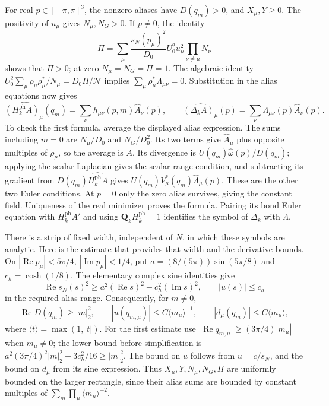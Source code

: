For real $p\in[-\pi,\pi]^3$, the nonzero aliases have $D(q_m)>0$,
and $X_\mu,Y\ge0$. The positivity of $u_\mu$ gives $N_\mu,N_G>0$.
If $p\ne0$, the identity
\begin{equation}\label{eq:photon-Pi-positive}
 \Pi=\sum_\mu\frac{s_N(p_\mu)^2}{D_0}
                 U_0^2u_\mu^2\prod_{\nu\ne\mu}N_\nu
\end{equation}
shows that $\Pi>0$; at zero $N_\mu=N_G=\Pi=1$.
The algebraic identity
$U_0^2\sum_\mu\rho_\mu\rho_\mu^*/N_\mu=D_0\Pi/\mathcal N$
implies $\sum_\mu\rho_\mu^*\Lambda_{\mu\nu}=0$.
Substitution in the alias equations now gives
\[
 \widehat{(H_k^{\mathrm{ph}}A)_\mu}(q_m)
      =\sum_\nu h_{\mu\nu}(p,m)\widehat A_\nu(p),\qquad
 \widehat{(\Delta_kA)_\mu}(p)
      =\sum_\nu\Lambda_{\mu\nu}(p)\widehat A_\nu(p).
\]
To check the first formula, average the displayed alias expression.
The sums including $m=0$ are $N_\mu/D_0$ and $N_G/D_0^2$.
Its two terms give $\widehat A_\mu$ plus opposite multiples of
$\rho_\mu$, so the average is $A$. Its divergence is
$U(q_m)\widehat\omega(p)/D(q_m)$; applying the scalar Laplacian
gives the scalar range condition, and subtracting its gradient from
$D(q_m)\widehat{H_k^{\mathrm{ph}}A}$ gives
$U(q_m)V_\mu^*(q_m)\widehat\Lambda_\mu(p)$.
These are the other two Euler conditions. At $p=0$ only the zero
alias survives, giving the constant field. Uniqueness of the real
minimizer proves the formula. Pairing its bond Euler equation with
$H_k^{\mathrm{ph}}A'$ and using $\mathbf Q_kH_k^{\mathrm{ph}}=1$
identifies the symbol of $\Delta_k$ with $\Lambda$.

There is a strip of fixed width, independent of $N$, in which these
symbols are analytic. Here is the estimate that provides that width
and the derivative bounds. On
$|\operatorname{Re}p_\mu|<5\pi/4$,
$|\operatorname{Im}p_\mu|<1/4$, put
$a=(8/(5\pi))\sin(5\pi/8)$ and $c_h=\cosh(1/8)$.
The elementary complex sine identities give
\[
 \operatorname{Re}s_N(s)^2\ge
       a^2(\operatorname{Re}s)^2-c_h^2(\operatorname{Im}s)^2,
 \qquad |u(s)|\le c_h
\]
in the required alias range. Consequently, for $m\ne0$,
\begin{equation}\label{eq:photon-alias-estimates}
 \operatorname{Re}D(q_m)\ge|m|_2^2,\qquad
 |u(q_{m,\mu})|\le C\langle m_\mu\rangle^{-1},\qquad
 |d_\mu(q_m)|\le C\langle m_\mu\rangle,
\end{equation}
where $\langle t\rangle=\max(1,|t|)$.
For the first estimate use
$|\operatorname{Re}q_{m,\mu}|\ge(3\pi/4)|m_\mu|$ when
$m_\mu\ne0$; the lower bound before simplification is
$a^2(3\pi/4)^2|m|_2^2-3c_h^2/16\ge|m|_2^2$.
The bound on $u$ follows from $u=c/s_N$, and the bound on $d_\mu$
from its sine expression. Thus $X_\mu,Y,N_\mu,N_G,\Pi$ are
uniformly bounded on the larger rectangle, since their alias sums
are bounded by constant multiples of
$\sum_m\prod_\mu\langle m_\mu\rangle^{-2}$.

